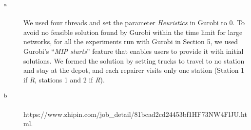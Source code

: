 \documentclass[
  english,
]{article}
\begin{document}
\begin{otherlanguage}{english}
\begin{description}
\item[\textsuperscript{a}]
\protect{}\label{np125}
We used four threads and set the parameter \emph{Heuristics} in Gurobi to 0. To avoid no feasible
solution found by Gurobi within the time limit for large networks, for all the experiments run with
Gurobi in Section 5, we used Gurobi's ``\emph{MIP starts}'' feature that enables users to provide it
with initial solutions. We formed the solution by setting trucks to travel to no station and stay at
the depot, and each repairer visits only one station (Station 1 if \emph{\textbar R},
stations 1 and 2 if \textbar{}\emph{R}).
\end{description}

\begin{description}
\item[\textsuperscript{b}]
\protect{}\label{np130}
https://www.zhipin.com/job\_detail/81bcad2cd24453bf1HF73NW4FlJU.html.
\end{description}

\end{otherlanguage}
\end{document}

